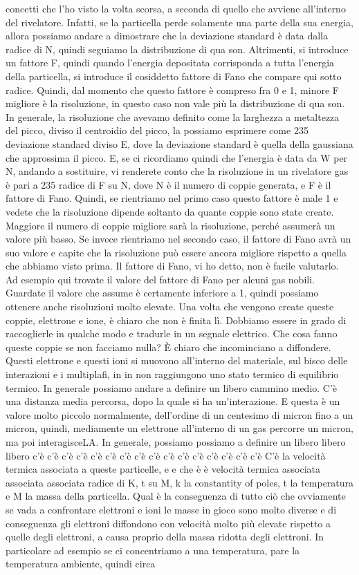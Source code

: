concetti che l'ho visto la volta scorsa, a seconda di quello che avviene all'interno del rivelatore. Infatti, se la particella perde solamente una parte della sua energia, allora possiamo andare a dimostrare che la deviazione standard è data dalla radice di N, quindi seguiamo la distribuzione di qua son. Altrimenti, si introduce un fattore F, quindi quando l'energia depositata corrisponda a tutta l'energia della particella, si introduce il cosiddetto fattore di Fano che compare qui sotto radice. Quindi, dal momento che questo fattore è compreso fra 0 e 1, minore F migliore è la risoluzione, in questo caso non vale più la distribuzione di qua son. In generale, la risoluzione che avevamo definito come la larghezza a metaltezza del picco, diviso il centroidio del picco, la possiamo esprimere come 235 deviazione standard diviso E, dove la deviazione standard è quella della gaussiana che approssima il picco. E, se ci ricordiamo quindi che l'energia è data da W per N, andando a sostituire, vi renderete conto che la risoluzione in un rivelatore gas è pari a 235 radice di F su N, dove N è il numero di coppie generata, e F è il fattore di Fano. Quindi, se rientriamo nel primo caso questo fattore è male 1 e vedete che la risoluzione dipende soltanto da quante coppie sono state create. Maggiore il numero di coppie migliore sarà la risoluzione, perché assumerà un valore più basso. Se invece rientriamo nel secondo caso, il fattore di Fano avrà un suo valore e capite che la risoluzione può essere ancora migliore rispetto a quella che abbiamo visto prima. Il fattore di Fano, vi ho detto, non è facile valutarlo. Ad esempio qui trovate il valore del fattore di Fano per alcuni gas nobili. Guardate il valore che assume è certamente inferiore a 1, quindi possiamo ottenere anche risoluzioni molto elevate. Una volta che vengono create queste coppie, elettrone e ione, è chiaro che non è finita lì. Dobbiamo essere in grado di raccoglierle in qualche modo e tradurle in un segnale elettrico. Che cosa fanno queste coppie se non facciamo nulla? È chiaro che incominciano a diffondere. Questi elettrone e questi ioni si muovono all'interno del materiale, sul bisco delle interazioni e i multiplafi, in in non raggiungono uno stato termico di equilibrio termico. In generale possiamo andare a definire un libero cammino medio. C'è una distanza media percorsa, dopo la quale si ha un'interazione. E questa è un valore molto piccolo normalmente, dell'ordine di un centesimo di micron fino a un micron, quindi, mediamente un elettrone all'interno di un gas percorre un micron, ma poi interagisceLA. In generale, possiamo possiamo a definire un libero libero libero c'è c'è c'è c'è c'è c'è c'è c'è c'è c'è c'è c'è c'è c'è c'è c'è C'è la velocità termica associata a queste particelle, e e che è è velocità termica associata associata associata radice di K, t su M, k la constantity of poles, t la temperatura e M la massa della particella. Qual è la conseguenza di tutto ciò che ovviamente se vada a confrontare elettroni e ioni le masse in gioco sono molto diverse e di conseguenza gli elettroni diffondono con velocità molto più elevate rispetto a quelle degli elettroni, a causa proprio della massa ridotta degli elettroni. In particolare ad esempio se ci concentriamo a una temperatura, pare la temperatura ambiente, quindi circa 